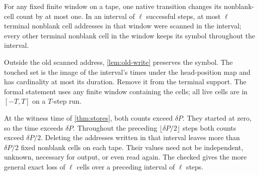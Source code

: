 \begin{lemma}\label{lem:persistent-cells}
For any fixed finite window on a tape, one native transition changes its
nonblank-cell count by at most one. In an interval of $\ell$ successful steps,
at most $\ell$ terminal nonblank cell addresses in that window were scanned
in the interval; every other terminal nonblank cell in the window keeps its
symbol throughout the interval.
\end{lemma}
\begin{outline}
Outside the old scanned address, \cref{lem:old-write} preserves the symbol.
The touched set is the image of the interval's times under the head-position
map and has cardinality at most its duration. Remove it from the terminal
support. The formal statement uses any finite window containing the cells;
all live cells are in $[-T,T]$ on a $T$-step run.
\end{outline}

At the witness time of \cref{thm:stores}, both counts exceed $\delta P$.
They started at zero, so the time exceeds $\delta P$. Throughout the preceding
$\lfloor\delta P/2\rfloor$ steps both counts exceed $\delta P/2$.
Deleting the addresses written in that interval leaves more than
$\delta P/2$ fixed nonblank cells on each tape. Their values need not be
independent, unknown, necessary for output, or even read again.
The checked  gives the more
general exact loss of $\ell$ cells over a preceding interval of $\ell$ steps.
